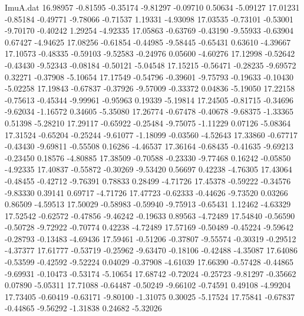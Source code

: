 \begin{filecontents}{ImuA.dat}
  16.98957   -0.81595   -0.35174   -9.81297   -0.09710    0.50634   -5.09127
  17.01231   -0.85184   -0.49771   -9.78066   -0.71537    1.19331   -4.93098
  17.03535   -0.73101   -0.53001   -9.70170   -0.40242    1.29254   -4.92335
  17.05863   -0.63769   -0.43190   -9.55933   -0.63904    0.67427   -4.94625
  17.08256   -0.61854   -0.44985   -9.58445   -0.65431    0.63610   -4.39667
  17.10573   -0.48335   -0.59103   -9.52583   -0.24976    0.05600   -4.60276
  17.12998   -0.52642   -0.43430   -9.52343   -0.08184   -0.50121   -5.04548
  17.15215   -0.56471   -0.28235   -9.69572    0.32271   -0.37908   -5.10654
  17.17549   -0.54796   -0.39601   -9.75793   -0.19633   -0.10430   -5.02258
  17.19843   -0.67837   -0.37926   -9.57009   -0.33372    0.04836   -5.19050
  17.22158   -0.75613   -0.45344   -9.99961   -0.95963    0.19339   -5.19814
  17.24505   -0.81715   -0.34696   -9.62034   -1.16572    0.34605   -5.35080
  17.26774   -0.67478   -0.40678   -9.68375   -1.33365    0.51398   -5.28210
  17.29117   -0.65922   -0.25484   -9.75075   -1.11229    0.07126   -5.08364
  17.31524   -0.65204   -0.25244   -9.61077   -1.18099   -0.03560   -4.52643
  17.33860   -0.67717   -0.43430   -9.69811   -0.55508    0.16286   -4.46537
  17.36164   -0.68435   -0.41635   -9.69213   -0.23450    0.18576   -4.80885
  17.38509   -0.70588   -0.23330   -9.77468    0.16242   -0.05850   -4.92335
  17.40837   -0.55872   -0.30269   -9.53420    0.56697    0.42238   -4.76305
  17.43064   -0.48455   -0.42712   -9.76391    0.78833    0.28499   -4.71726
  17.45378   -0.59222   -0.34576   -9.83330    0.39141    0.69717   -4.71726
  17.47723   -0.62333   -0.44626   -9.73520    0.03266    0.86509   -4.59513
  17.50029   -0.58983   -0.59940   -9.75913   -0.65431    1.12462   -4.63329
  17.52542   -0.62572   -0.47856   -9.46242   -0.19633    0.89563   -4.72489
  17.54840   -0.56590   -0.50728   -9.72922   -0.70774    0.42238   -4.72489
  17.57169   -0.50489   -0.45224   -9.59642   -0.28793   -0.13483   -4.69436
  17.59461   -0.51206   -0.37807   -9.55574   -0.30319   -0.29512   -4.37377
  17.61777   -0.53719   -0.25962   -9.63470   -0.18106   -0.42488   -4.35087
  17.64086   -0.53599   -0.42592   -9.52224    0.04029   -0.37908   -4.61039
  17.66390   -0.57428   -0.44865   -9.69931   -0.10473   -0.53174   -5.10654
  17.68742   -0.72024   -0.25723   -9.81297   -0.35662    0.07890   -5.05311
  17.71088   -0.64487   -0.50249   -9.66102   -0.74591    0.49108   -4.99204
  17.73405   -0.60419   -0.63171   -9.80100   -1.31075    0.30025   -5.17524
  17.75841   -0.67837   -0.44865   -9.56292   -1.31838    0.24682   -5.32026

\end{filecontents}
